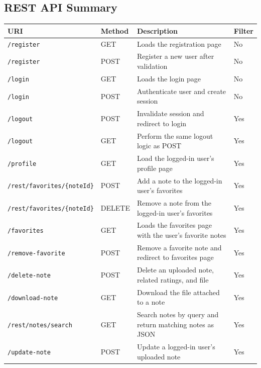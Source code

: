 \subsection{REST API Summary}


\begin{longtable}{|p{}|p{}|p{}|p{}|}
\hline
\textbf{URI} & \textbf{Method} & \textbf{Description} & \textbf{Filter} \\\hline
            \texttt{/register} & GET & Loads the registration page & No \\\hline
            \texttt{/register} & POST & Register a new user after validation & No \\\hline
            \texttt{/login} & GET & Loads the login page & No\\\hline
            \texttt{/login} & POST & Authenticate user and create session & No \\\hline
            \texttt{/logout} & POST & Invalidate session and redirect to login & Yes \\\hline
            \texttt{/logout} & GET & Perform the same logout logic as POST & Yes \\\hline
            \texttt{/profile} & GET & Load the logged-in user's profile page & Yes \\\hline
            \texttt{/rest/favorites/\{noteId\}} & POST & Add a note to the logged-in user's favorites & Yes \\\hline
            \texttt{/rest/favorites/\{noteId\}} & DELETE & Remove a note from the logged-in user's favorites & Yes \\\hline
            \texttt{/favorites} & GET & Loads the favorites page with the user's favorite notes & Yes \\\hline
            \texttt{/remove-favorite} & POST & Remove a favorite note and redirect to favorites page & Yes \\\hline
            \texttt{/delete-note} & POST & Delete an uploaded note, related ratings, and file & Yes \\\hline
            \texttt{/download-note} & GET & Download the file attached to a note & Yes \\\hline
            \texttt{/rest/notes/search} & GET & Search notes by query and return matching notes as JSON & Yes \\\hline
            \texttt{/update-note} & POST & Update a logged-in user's uploaded note & Yes \\\hline

\end{longtable}
